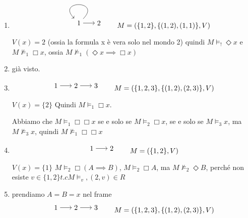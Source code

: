 \documentclass[../main.tex]{subfiles}
\begin{document}
\begin{enumerate}
    \item \begin{equation*}
              \begin{tikzpicture}[->]
                  \node (1) {1};
                  \node (2) [right of=1] {2};
                  \path
                  (1) edge[loop] node {} (1)
                  (1) edge node {} (2);
              \end{tikzpicture}
              \qquad
              M = (\{1,2\},\{(1,2),(1,1)\}, V)
          \end{equation*}

          $V(x) = 2 $ (ossia la formula x è vera solo nel mondo 2) quindi $M \vDash_! \Diamond x$ e $M \nvDash_1 \Box x$, ossia $M \nvDash_1 (\Diamond x \implies \Box x)$
    \item già visto.
    \item \begin{equation*}
              \begin{tikzpicture}[->]
                  \node (1) {1};
                  \node (2) [right of=1] {2};
                  \node (3) [right of=2] {3};
                  \path
                  (1) edge node {} (2)
                  (2) edge node {} (3);
              \end{tikzpicture}
              \qquad
              M = (\{1,2,3\},\{(1,2),(2,3)\}, V)
          \end{equation*}

          $V(x) = \{2\}$ Quindi $M \vDash_1 \Box x$.

          Abbiamo che $M \vDash_1 \Box \Box x$ se e solo se $M \vDash_2 \Box x$, se e solo se $M \vDash_3 x$, ma $M \nvDash_3 x$, quindi $M \nvDash_1 \Box \Box x$
    \item \begin{equation*}
              \begin{tikzpicture}[->]
                  \node (1) {1};
                  \node (2) [right of=1] {2};
                  \path
                  (1) edge node {} (2);
              \end{tikzpicture}
              \qquad
              M = (\{1,2\}, V)
          \end{equation*}

          $V(x) = \{1\}$ $M \vDash_2 \Box (A \implies B)$, $M \vDash_2 \Box A$, ma $M \nvDash_2 \Diamond B$, perché non esiste $v \in \{1,2\} t.c M \vDash_v , (2,v) \in R$
    \item prendiamo $A = B = x$ nel frame
          \begin{equation*}
              \begin{tikzpicture}[->]
                  \node (1) {1};
                  \node (2) [right of=1] {2};
                  \node (3) [right of=2] {3};
                  \path
                  (1) edge node {} (2)
                  (2) edge node {} (3);
              \end{tikzpicture}
              \qquad
              M = (\{1,2,3\},\{(1,2),(2,3)\}, V)
          \end{equation*}


\end{enumerate}
\end{document}
